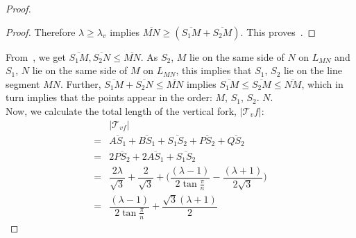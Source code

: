 \begin{proof}
\begin{proof}
Therefore $\lambda \ge \lambda_v$ implies $\overline{MN} \ge (\overline{S_1M} + \overline{S_2M})$. This proves~.
\end{proof}

From~, we get $\overline{S_1M}, \overline{S_2N} \le \overline{MN}$. As $S_2$, $M$ lie on the same side of $N$ on $L_{MN}$ and $S_1$, $N$ lie on the same side of $M$ on $L_{MN}$, this implies that $S_1$, $S_2$ lie on the line segment $MN$. Further, $\overline{S_1M} + \overline{S_2N} \le \overline{MN}$ implies $\overline{S_1M} \le \overline {S_2M} \le \overline{NM}$, which in turn implies that the points appear in the order: $M$, $S_1$, $S_2$. $N$.\\

Now, we calculate the total length of the vertical fork, $|\mathcal T_vf|$:
\begin{align*}
  & |\mathcal T_{vf}|\\
= & \overline{AS_1} + \overline{BS_1} + \overline{S_1S_2} + \overline{PS_2} + \overline{QS_2}\\
= & 2 \overline{PS_2} + 2 \overline{AS_1} + \overline{S_1S_2}\\
= & \dfrac{2 \lambda} {\sqrt 3} + \dfrac 2 {\sqrt 3} + \bigg( \dfrac{(\lambda - 1)}{2 \tan \frac \pi n} - \dfrac {(\lambda + 1)} {2\sqrt{3}} \bigg)\\
= & \dfrac{(\lambda - 1)}{2 \tan \frac \pi n} + \dfrac {\sqrt 3 (\lambda + 1)} {2}
\end{align*}








\end{proof}
